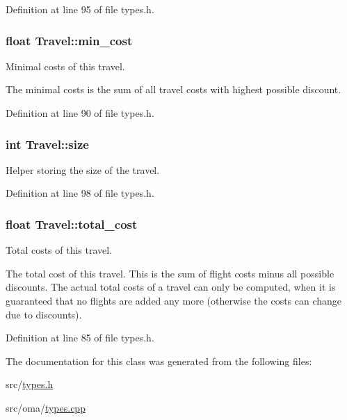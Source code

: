 Definition at line 95 of file types.\-h.

\hypertarget{class_travel_a29e09bf718386754dc5cf85bee4305f5}{
\subsubsection[{min\-\_\-cost}]{\setlength{\rightskip}{0pt plus 5cm}float Travel\-::min\-\_\-cost}}\label{class_travel_a29e09bf718386754dc5cf85bee4305f5}


Minimal costs of this travel. 

The minimal costs is the sum of all travel costs with highest possible discount. 

Definition at line 90 of file types.\-h.

\hypertarget{class_travel_a6ba08aa2208a879b9bc1612133e0b2bf}{
\subsubsection[{size}]{\setlength{\rightskip}{0pt plus 5cm}int Travel\-::size}}\label{class_travel_a6ba08aa2208a879b9bc1612133e0b2bf}


Helper storing the size of the travel. 



Definition at line 98 of file types.\-h.

\hypertarget{class_travel_a8493b95322d534e6ddff9e003b591ec5}{
\subsubsection[{total\-\_\-cost}]{\setlength{\rightskip}{0pt plus 5cm}float Travel\-::total\-\_\-cost}}\label{class_travel_a8493b95322d534e6ddff9e003b591ec5}


Total costs of this travel. 

The total cost of this travel. This is the sum of flight costs minus all possible discounts. The actual total costs of a travel can only be computed, when it is guaranteed that no flights are added any more (otherwise the costs can change due to discounts). 

Definition at line 85 of file types.\-h.



The documentation for this class was generated from the following files\-:\begin{DoxyCompactItemize}
\item 
src/\hyperlink{types_8h}{types.\-h}\item 
src/oma/\hyperlink{types_8cpp}{types.\-cpp}\end{DoxyCompactItemize}

